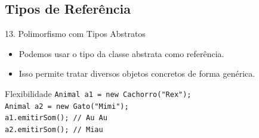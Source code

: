 \documentclass[9pt]{beamer}
\begin{document}
\subsection{Tipos de Referência}
\begin{frame}{13. Polimorfismo com Tipos Abstratos}
    \begin{itemize}
        \item Podemos usar o tipo da classe abstrata como referência.
        \item Isso permite tratar diversos objetos concretos de forma genérica.
    \end{itemize}
    \begin{block}{Flexibilidade}
        \texttt{Animal a1 = new Cachorro("Rex");}\\
        \texttt{Animal a2 = new Gato("Mimi");}\\
        \texttt{a1.emitirSom(); // Au Au}\\
        \texttt{a2.emitirSom(); // Miau}
    \end{block}
\end{frame}
\end{document}
